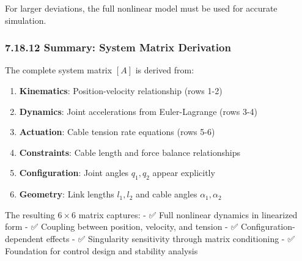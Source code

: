 For larger deviations, the full nonlinear model must be used for accurate simulation.

\subsubsection{7.18.12 Summary: System Matrix Derivation}

The complete system matrix $[A]$ is derived from:

\begin{enumerate}
    \item \textbf{Kinematics}: Position-velocity relationship (rows 1-2)
    
    \item \textbf{Dynamics}: Joint accelerations from Euler-Lagrange (rows 3-4)
    
    \item \textbf{Actuation}: Cable tension rate equations (rows 5-6)
    
    \item \textbf{Constraints}: Cable length and force balance relationships
    
    \item \textbf{Configuration}: Joint angles $q_1, q_2$ appear explicitly
    
    \item \textbf{Geometry}: Link lengths $l_1, l_2$ and cable angles $\alpha_1, \alpha_2$
\end{enumerate}

The resulting $6 \times 6$ matrix captures:
- ✅ Full nonlinear dynamics in linearized form
- ✅ Coupling between position, velocity, and tension
- ✅ Configuration-dependent effects
- ✅ Singularity sensitivity through matrix conditioning
- ✅ Foundation for control design and stability analysis

